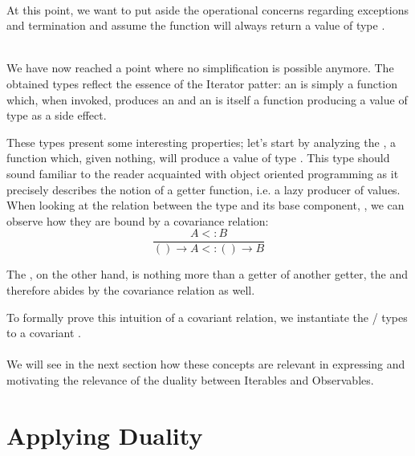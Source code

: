 \\

At this point, we want to put aside the operational concerns regarding exceptions and termination and assume the  function will always return a value of type .

\\

We have now reached a point where no simplification is possible anymore. The obtained types reflect the essence of the Iterator patter: an  is simply a function which, when invoked, produces an  and an  is itself a function producing a value of type  as a side effect. 

These types present some interesting properties; let's start by analyzing the , a function which, given nothing, will produce a value of type . This type should sound familiar to the reader acquainted with object oriented programming as it precisely describes the notion of a getter function, i.e. a lazy producer of values. When looking at the relation between the  type and its base component, , we can observe how they are bound by a covariance relation:
\begin{displaymath}
\frac{A <: B}{() \rightarrow A <: () \rightarrow B} 
\end{displaymath}

The , on the other hand, is nothing more than a getter of another getter, the  and therefore abides by the covariance relation as well.

To formally prove this intuition of a covariant relation, we instantiate the / types to a covariant .\\

\\

We will see in the next section how these concepts are relevant in expressing and motivating the relevance of the duality between Iterables and Observables.

\section{Applying Duality}

